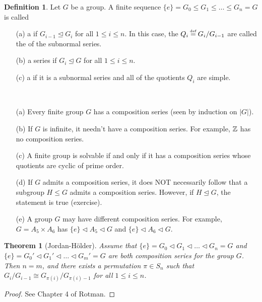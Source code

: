 \documentclass[11pt]{book}
\newcounter{counter}
\newtheorem{theorem}[counter]{Theorem}   \newtheorem*{theorem*}{Theorem}   \newtheorem{lemma}[counter]{Lemma}   \newtheorem{corollary}[counter]{Corollary}
\theoremstyle{definition}   \newtheorem{defn}[counter]{Definition} %
\newcommand{\nsg}{\mathrel{\unlhd}}   \newcommand{\ind}{\parindent24pt}   \newcommand{\vn}{\varnothing}
\newcommand\myeq{\mathrel{\overset{\makebox[0pt]{\mbox{\normalfont\tiny\sffamily \textrm{def}}}}{=}}}
\newcommand{\tl}{\triangleleft}   \newcommand{\sd}[1]{\rtimes_{#1}}   \newcommand{\x}{^{\times}}   \newcommand{\cyc}[1]{\begin{pmatrix} #1 \end{pmatrix}}
\newcommand{\vs}{\vspace{8pt}}
\numberwithin{counter}{chapter}
\begin{document}
\vs

\begin{defn}
Let $G$ be a group. A finite sequence $\{e\} = G_0 \leq G_1 \leq \dots \leq G_n = G$ is called
	\begin{enumerate}
	\item[(a)] a  if $G_{i-1} \nsg G_i$ for all $1 \leq i \leq n$. In this case, the $Q_i \myeq G_i/G_{i-1}$ are called the  of the subnormal series.
	\item[(b)] a  series if $G_i \nsg G$ for all $1 \leq i \leq n$.
	\item[(c)] a  if it is a subnormal series and all of the quotients $Q_i$ are simple.
	\end{enumerate}
\end{defn}

\vs

\begin{remark}\
\begin{enumerate}
\item[(a)] Every finite group $G$ has a composition series (seen by induction on $|G|$).
\item[(b)] If $G$ is infinite, it needn't have a composition series. For example, $\operatorname{\mathbb{Z}}$ has no composition series.
\item[(c)] A finite group is solvable if and only if it has a composition series whose quotients are cyclic of prime order.
\item[(d)] If $G$ admits a composition series, it does NOT necessarily follow that a subgroup $H \leq G$ admits a composition series. However, if $H \nsg G$, the statement is true (exercise).
\item[(e)] A group $G$ may have different composition series. For example, $G = A_5 \times A_6$ has $\{e\} \tl A_5 \tl G$ and $\{e\} \tl A_6 \tl G$.
\end{enumerate}
\end{remark}

\vs

\begin{theorem}[Jordan-H\"older]
Assume that $\{e\} = G_0 \tl G_1 \tl \dots \tl G_n = G$ and $\{e\} = G_0' \tl G_1' \tl \dots \tl G_m' = G$ are both composition series for the group $G$. Then $n=m$, and there exists a permutation $\pi \in S_n$ such that $G_i/G_{i-1} \cong G_{\pi(i)}/G_{\pi(i)-1}$ for all $1 \leq i \leq n$.
\end{theorem}

\begin{proof}
See Chapter 4 of Rotman.
\end{proof}
\end{document}
